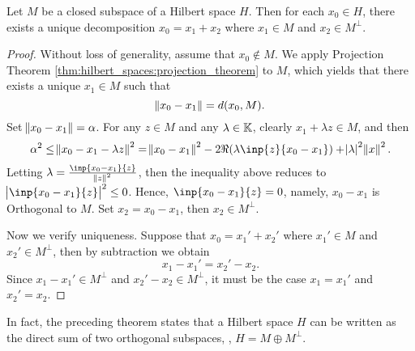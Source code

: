 \begin{thm}
\label{thm:hilbert_spaces:orthogonal_decomposition}
Let $M$ be a closed subspace of a Hilbert space $H$. 
Then for each $x_0 \in H$, there exists a unique decomposition 
$x_0 = x_1 + x_2$ where $x_1 \in M$ and $x_2 \in M^\perp$. 
\end{thm}
\begin{proof}
Without loss of generality, assume that $x_0 \notin M$. 
We apply Projection Theorem \ref{thm:hilbert_spaces:projection_theorem} to 
$M$, which yields that there exists a unique $x_1 \in M$ such that 
\begin{equation*}
    \norm{x_0 - x_1} = d(x_0, M). 
\end{equation*}
Set $\norm{x_0 - x_1} = \alpha$. 
For any $z \in M$ and any $\lambda \in \mathbb{K}$, clearly $x_1 + \lambda z \in M$, 
and then 
\begin{equation*}
    \begin{aligned}
        \alpha^2 \le \norm{x_0 - x_1 - \lambda z}^2 
        = \norm{x_0 - x_1}^2 - 2 \Re (\lambda \inp{z}{x_0 - x_1}) 
            + \abs{\lambda}^2 \norm{x}^2.
    \end{aligned}
\end{equation*}
Letting $\lambda = \frac{\inp{x_0 - x_1}{z}}{\norm{z}^2}$, then the 
inequality above reduces to $\abs{\inp{x_0 - x_1}{z}}^2 \le 0$. 
Hence, $\inp{x_0 - x_1}{z} = 0$, namely, $x_0 - x_1$ is Orthogonal to $M$. 
Set $x_2 = x_0 - x_1$, then $x_2 \in M^\perp$. 

Now we verify uniqueness. 
Suppose that $x_0 = x_1' + x_2'$ where $x_1' \in M$ and $x_2' \in M^\perp$, 
then by subtraction we obtain 
\begin{equation*}
    x_1 - x_1' = x_2' - x_2. 
\end{equation*}
Since $x_1 - x_1' \in M^\perp$ and $x_2' - x_2 \in M^\perp$, it must be the 
case $x_1 = x_1'$ and $x_2' = x_2$. 
\end{proof}

In fact, the preceding theorem states that a Hilbert space $H$ can be 
written as the direct sum of two orthogonal subspaces, \ie, $H = M \oplus 
M^\perp$. 

